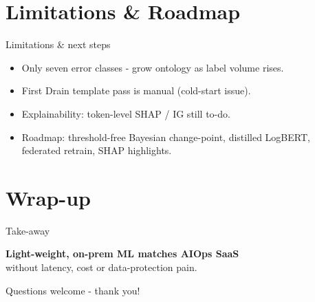\documentclass[14pt,aspectratio=169]{beamer}
\begin{document}
\section{Limitations \& Roadmap}
\begin{frame}{Limitations \& next steps}
\begin{itemize}[<+->]
  \item Only seven error classes - grow ontology as label volume rises.
  \item First Drain template pass is manual (cold-start issue).
  \item Explainability: token-level SHAP / IG still to-do.
  \item Roadmap: threshold-free Bayesian change-point, distilled LogBERT, federated retrain, SHAP highlights.
\end{itemize}
\end{frame}

\section{Wrap-up}
\begin{frame}{Take-away}
\vspace{1em}
\begin{center}
\Large
\textbf{Light-weight, on-prem ML matches AIOps SaaS}\\[0.4em]
without latency, cost or data-protection pain.
\end{center}

\vspace{1.2em}
\begin{center}
\small
Questions welcome - thank you!
\end{center}
\end{frame}

\end{document}
